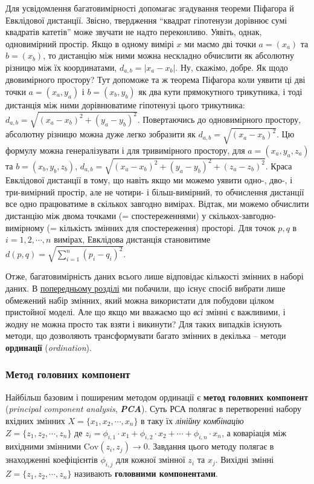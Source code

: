 \documentclass[
  11pt,
]{book}
\begin{document}
Для усвідомлення багатовимірності допомагає згадування теореми Піфагора й Евклідової дистанції. Звісно, твердження ``квадрат гіпотенузи дорівнює сумі квадратів катетів'' може звучати не надто переконливо. Уявіть, однак, одновимірний простір. Якщо в одному вимірі \(x\) ми маємо дві точки \(a = (x_a)\) та \(b = (x_b)\), то дистанцію між ними можна нескладно обчислити як абсолютну різницю між їх координатами, \(d_{a, b} = |x_a - x_b|\). Ну, скажімо, добре. Як щодо двовимірного простору? Тут допоможе та ж теорема Піфагора коли уявити ці дві точки \(a = (x_a, y_a)\) і \(b = (x_b, y_b)\) як два кути прямокутного трикутника, і тоді дистанція між ними дорівнюватиме гіпотенузі цього трикутника: \(d_{a, b} = \sqrt{(x_a - x_b)^2 + (y_a - y_b)^2}\). Повертаючись до одновимірного простору, абсолютну різницю можна дуже легко зобразити як \(d_{a,b} = \sqrt{(x_a - x_b)^2}\). Цю формулу можна генералізувати і для тривимірного простору, для \(a = (x_a, y_a, z_a)\) та \(b = (x_b, y_b, z_b)\), \(d_{a, b} = \sqrt{(x_a - x_b)^2 + (y_a - y_b)^2 + (z_a - z_b)^2}\). Краса Евклідової дистанції в тому, що навіть якщо ми можемо уявити одно-, дво-, і три-вимірний простір, але не чотири- і більш-вимірний, то обчислення дистанції все одно працюватиме в скількох завгодно вимірах. Відтак, ми можемо обчислити дистанцію між двома точками (= спостереженнями) у скількох-завгодно-вимірному (= кількість змінних для спостереження) просторі. Для точок \(p, q\) в \(i = 1, 2, \cdots, n\) вимірах, Евклідова дистанція становитиме \(d(p, q) = \sqrt{\sum \limits_{i=1}^{n}(p_i - q_i)^2}\).

Отже, багатовимірність даних всього лише відповідає кількості змінних в наборі даних. В \hyperref[aic]{попередньому розділі} ми побачили, що існує спосіб вибрати лише обмежений набір змінних, який можна використати для побудови цілком пристойної моделі. Але що якщо ми вважаємо що \emph{всі} змінні є важливими, і жодну не можна просто так взяти і викинути? Для таких випадків існують методи, що дозволяють трансформувати багато змінних в декілька -- методи \textbf{ординації} (\emph{ordination}).

\subsubsection{Метод головних компонент}\label{ux43cux435ux442ux43eux434-ux433ux43eux43bux43eux432ux43dux438ux445-ux43aux43eux43cux43fux43eux43dux435ux43dux442}

Найбільш базовим і поширеним методом ординації є \textbf{метод головних компонент} (\emph{principal component analysis}, \textbf{\emph{PCA}}). Суть РСА полягає в перетворенні набору вхідних змінних \(X = \{x_1, x_2, \cdots, x_n\}\) в таку їх \emph{лінійну комбінацію} \(Z = \{z_1, z_2, \cdots, z_n\}\) де \(z_i = \phi_{i,1} \cdot x_1 + \phi_{i,2} \cdot x_2 + \cdots + \phi_{i,n} \cdot x_n\), а коваріація між вихідними змінними \(\text{Cov}(z_i, z_j) \rightarrow 0\). Завдання цього методу полягає в знаходженні коефіцієнтів \(\phi_{i, j}\) для кожної змінної \(z_i\) та \(x_j\). Вихідні змінні \(Z = \{z_1, z_2, \cdots, z_n\}\) називають \textbf{головними компонентами}.
\end{document}

